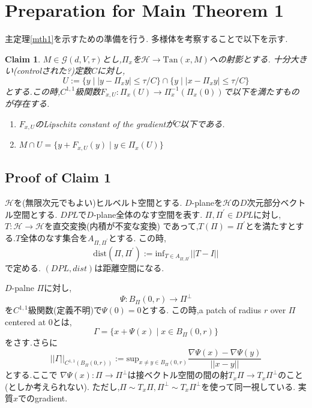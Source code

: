 \documentclass{ujarticle}
\newtheorem{clm}{Claim}
\newcommand{\bpd}{B_{\Pi}(0,r)}
\newcommand{\gnd}{||\Gamma||_{C^{1,1}(\bpd)}}
\newcommand{\gdvt}{\mathcal{G}(d,V,\tau)}
\begin{document}
\section{Preparation for Main Theorem 1}
\label{Preparation for Main Theorem 1}
主定理\ref{mth1}を示すための準備を行う.
多様体を考察することで以下を示す.
\begin{clm}
  $M \in \gdvt$とし,$\Pi_x$を$\mathcal{H} \to \mathrm{Tan}(x,M)$への射影とする.
  十分大きい(controlされた?)定数$C$に対し,
  \begin{equation*}
   U:= \{ y \mid |y - \Pi_xy| \le \tau/C \} \cap \{ y \mid |x - \Pi_x y| \le \tau/C \}
  \end{equation*}
  とする.この時,$C^{1,1}$級関数$F_{x,U}:\Pi_x(U) \to \Pi_x^{-1}(\Pi_x(0))$で以下を満たすものが存在する.
  \begin{enumerate}
    \item $F_{x,U}$のLipschitz constant of the gradientが$C$以下である.
    \item $ \displaystyle
    M \cap U = \{ y + F_{x,U}(y) \mid y \in \Pi_x(U) \} $
  \end{enumerate}
\end{clm}

\subsection{Proof of Claim 1}
\label{sec:Proof of CLAIM 1}

$\mathcal{H}$を(無限次元でもよい)ヒルベルト空間とする.
$D$-planeを$\mathcal{H}$の$D$次元部分ベクトル空間とする.
$DPL$で$D$-plane全体のなす空間を表す.
$\Pi,\Pi^\prime \in DPL$に対し,$T: \mathcal{H} \to \mathcal{H}$を直交変換(内積が不変な変換)
であって,$T(\Pi)= \Pi^\prime$とを満たすとする.$T$全体のなす集合を$A_{\Pi,\Pi^\prime}$とする.
この時,
\begin{equation*}
 \mathrm{dist} (\Pi,\Pi^\prime):= \mathrm{inf}_{T \in A_{\Pi,\Pi^\prime}} ||T -I||
\end{equation*}
で定める.
$(DPL,dist)$は距離空間になる.

$D$-palne $\Pi$に対し,
\begin{equation*}
 \Psi :\bpd \to \Pi^{\perp}
\end{equation*}
を$C^{1,1}$級関数(定義不明)で$\Psi(0)=0$とする.
この時,a patch of radius $r$ over $\Pi$ centered at 0とは,
\begin{equation*}
 \Gamma=\{ x + \Psi(x) \mid x \in \bpd \}
\end{equation*}
をさす.さらに
\begin{equation*}
 \gnd := \mathrm{sup}_{x \neq y \in \bpd} \frac{ \nabla \Psi(x) - \nabla \Psi(y)}{||x - y||}
\end{equation*}
とする.ここで
$\nabla\Psi(x):\Pi \to \Pi^{\perp}$は接ベクトル空間の間の射$T_x\Pi \to T_x\Pi^{\perp}$のこと(としか考えられない).
ただし,$\Pi \sim T_x \Pi, \Pi^{\perp} \sim T_x\Pi^{\perp}$を使って同一視している.
実質$x$でのgradient.
\end{document}
